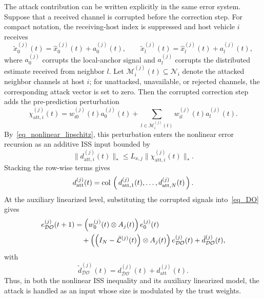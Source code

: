 \documentclass[journal,twoside]{IEEEtran}
\def\col#1{\mathop{{\rm col}\,\left(\,#1\,\right)}}
\def\L{\mathcal{L}} %
\def\N{\mathcal{N}} %
\def\DO{\mathcal{DO}} %
\begin{document}
The attack contribution can be written explicitly in the same error system.
Suppose that a received channel is corrupted before the correction step.
For compact notation, the receiving-host index is suppressed and host vehicle $i$ receives
\begin{equation}
    \tilde{x}_{0}^{(j)}(t)=\hat{x}_{0}^{(j)}(t)+a_{0}^{(j)}(t),
    \qquad
    \tilde{x}_{l}^{(j)}(t)=\hat{x}_{l}^{(j)}(t)+a_{l}^{(j)}(t),
\end{equation}
where $a_{0}^{(j)}$ corrupts the local-anchor signal and $a_{l}^{(j)}$ corrupts the distributed estimate received from neighbor $l$.
Let $\mathcal{M}_{i}^{(j)}(t)\subseteq\N_i$ denote the attacked neighbor channels at host $i$; for unattacked, unavailable, or rejected channels, the corresponding attack vector is set to zero.
Then the corrupted correction step adds the pre-prediction perturbation
{\small
\begin{equation}
\chi_{\mathrm{att},i}^{(j)}(t)
=w_{i0}^{(j)}(t)a_{0}^{(j)}(t)
+\sum_{l\in\mathcal{M}_{i}^{(j)}(t)}w_{il}^{(j)}(t)a_{l}^{(j)}(t).
\label{eq_attack_input}
\end{equation}
}
By~\eqref{eq_nonlinear_lipschitz}, this perturbation enters the nonlinear error recursion as an additive ISS input bounded by
\begin{equation}
\|d_{\mathrm{att},i}^{(j)}(t)\|_*
\le L_{x,j}\|\chi_{\mathrm{att},i}^{(j)}(t)\|_* .
\label{eq_attack_lipschitz_bound}
\end{equation}
Stacking the row-wise terms gives
\begin{equation}
    d_{\mathrm{att}}^{(j)}(t)
    =\col{d_{\mathrm{att},1}^{(j)}(t),\ldots,d_{\mathrm{att},N}^{(j)}(t)}.
\end{equation}
At the auxiliary linearized level, substituting the corrupted signals into~\eqref{eq_DO} gives
{\small
\begin{align}
e_{\DO}^{(j)}(t+1)
&= \left( w_{0}^{(j)}(t) \otimes A_j(t) \right) e_0^{(j)}(t)  \notag\\
&\quad+ \left( \left( I_{N} - \bar{\L}^{(j)}(t)  \right)  \otimes  A_j(t) \right) e_{\DO}^{(j)}(t)
+\tilde d_{\DO}^{(j)}(t),
\label{eq_error_attacked}
\end{align}
}
with
{\small
\begin{equation}
    \tilde d_{\DO}^{(j)}(t)
    =d_{\DO}^{(j)}(t)+d_{\mathrm{att}}^{(j)}(t).
\end{equation}
}
Thus, in both the nonlinear ISS inequality and its auxiliary linearized model, the attack is handled as an input whose size is modulated by the trust weights.
\end{document}
